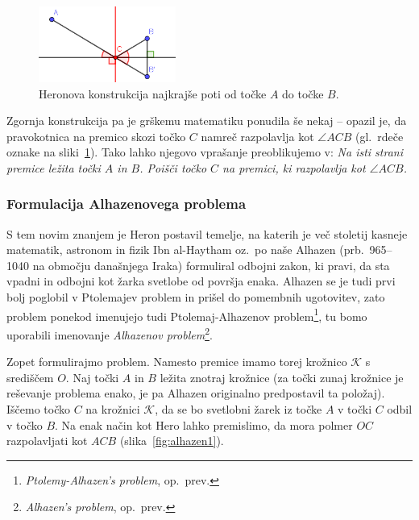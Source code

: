 \begin{figure}[h]
    \centering
    \includegraphics[width=0.4\textwidth]{images/alhazen/heron.png}
    \caption[Heronovo vprašanje]{Heronova konstrukcija najkrajše poti od točke $A$ do točke $B$.}
    \label{fig:heron}
\end{figure}

Zgornja konstrukcija pa je grškemu matematiku ponudila še nekaj -- opazil je, da pravokotnica na premico skozi točko $C$ namreč razpolavlja kot $\angle ACB$ (gl.\ rdeče oznake na sliki~\ref{fig:heron}). Tako lahko njegovo vprašanje preoblikujemo v: \emph{Na isti strani premice ležita točki $A$ in $B$. Poišči točko $C$ na premici, ki razpolavlja kot $\angle ACB$.}


\subsubsection*{Formulacija Alhazenovega problema}

S tem novim znanjem je Heron postavil temelje, na katerih je več stoletij kasneje matematik, astronom in fizik Ibn al-Haytham oz.\ po naše Alhazen (prb.\ 965--1040 na območju današnjega Iraka) formuliral odbojni zakon, ki pravi, da sta vpadni in odbojni kot žarka svetlobe od površja enaka. Alhazen se je tudi prvi bolj poglobil v Ptolemajev problem in prišel do pomembnih ugotovitev, zato problem ponekod imenujejo tudi Ptolemaj-Alhazenov problem\footnote{\emph{Ptolemy-Alhazen's problem}, op.\ prev.}, tu bomo uporabili imenovanje \emph{Alhazenov problem}\footnote{\emph{Alhazen's problem}, op.\ prev.}. 

Zopet formulirajmo problem. Namesto premice imamo torej krožnico $\mathcal{K}$ s središčem $O$. Naj točki $A$ in $B$ ležita znotraj krožnice (za točki zunaj krožnice je reševanje problema enako, je pa Alhazen originalno predpostavil ta položaj). Iščemo točko $C$ na krožnici $\mathcal{K}$, da se bo svetlobni žarek iz točke $A$ v točki $C$ odbil v točko $B$. Na enak način kot Hero lahko premislimo, da mora polmer $OC$ razpolavljati kot $ACB$ (slika~\ref{fig:alhazen1}).

